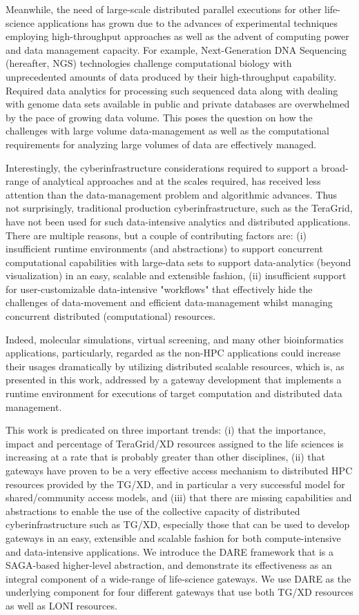 \documentclass{sig-alternate}
\begin{document}
Meanwhile, the need of large-scale distributed parallel executions for
other life-science applications has grown due to the advances of
experimental techniques employing high-throughput approaches as well as
the advent of computing power and data management capacity.  For
example, Next-Generation DNA Sequencing (hereafter, NGS) technologies
challenge computational biology with unprecedented amounts of data
produced by their high-throughput capability.  Required data analytics
for processing such sequenced data along with dealing with genome data
sets available in public and private databases are overwhelmed by the
pace of growing data volume.  This poses the question on how the challenges with large volume data-management as well as the computational requirements for analyzing large volumes of data are effectively managed.

Interestingly, the cyberinfrastructure considerations required to
support a broad-range of analytical approaches and at the scales
required, has received less attention than the data-management problem
and algorithmic advances.  Thus not surprisingly, traditional
production cyberinfrastructure, such as the TeraGrid, have not been
used for such data-intensive analytics and distributed applications. There are multiple reasons,
but a couple of contributing factors are: (i) insufficient runtime
environments (and abstractions) to support concurrent computational
capabilities with large-data sets to support data-analytics (beyond
visualization) in an easy, scalable and extensible fashion, (ii)
insufficient support for user-customizable data-intensive "workflows"
that effectively hide the challenges of data-movement and efficient
data-management whilst managing concurrent distributed (computational)
resources.

Indeed, molecular simulations, virtual screening, and many other bioinformatics applications, particularly, regarded as the non-HPC applications could increase their usages dramatically by utilizing distributed scalable resources, which is, as presented in this work, addressed by a gateway development that implements a runtime environment for executions of target computation and distributed data management.

This work is predicated on three important trends: (i) that the importance,
impact and percentage of TeraGrid/XD resources assigned to the
life sciences is increasing at a rate that is probably greater than
other disciplines, (ii) that gateways have proven to be a very
effective access mechanism to distributed HPC resources provided by
the TG/XD, and in particular a very successful model for
shared/community access models, and (iii) that there are missing
capabilities and abstractions to enable the use of the collective
capacity of distributed cyberinfrastructure such as TG/XD, especially
those that can be used to develop gateways in an easy, extensible and
scalable fashion for both compute-intensive and data-intensive
applications. We introduce the DARE framework that is a SAGA-based
higher-level abstraction, and demonstrate its effectiveness as an
integral component of a wide-range of life-science gateways. We
use DARE as the underlying component for four different
gateways that use both TG/XD resources as well as LONI resources.
\end{document}
